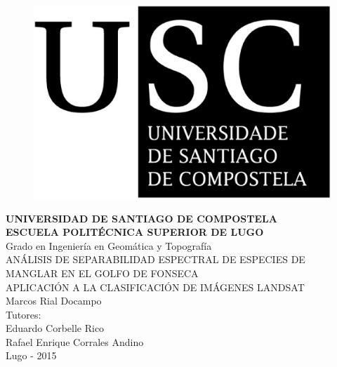 




\begin{figure}[t]
\centering
\includegraphics[scale=0.2]{./Imagenes/USCbn.eps} %
\end{figure}

\begin{center}
\textbf{{\Huge UNIVERSIDAD DE SANTIAGO DE COMPOSTELA}\\[1cm]
{\LARGE ESCUELA POLITÉCNICA SUPERIOR DE LUGO}}\\[1cm]
{\Large Grado en Ingeniería en Geomática y Topografía}\\[2cm]
{\LARGE ANÁLISIS DE SEPARABILIDAD ESPECTRAL DE ESPECIES DE MANGLAR EN EL GOLFO DE FONSECA}\\
{\LARGE APLICACIÓN A LA CLASIFICACIÓN DE IMÁGENES LANDSAT}\\[2cm]
{\large \vfill{Marcos Rial Docampo\\Tutores:\\Eduardo Corbelle Rico\\Rafael Enrique Corrales Andino}}\\
{\small \vfill{Lugo - 2015%
}}
\end{center}